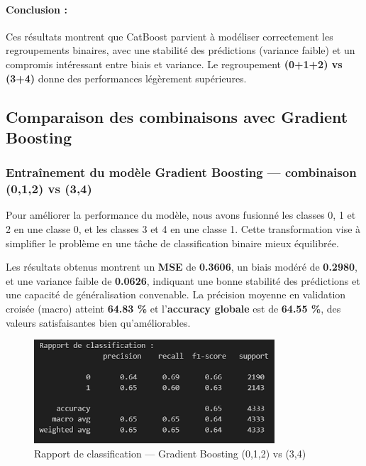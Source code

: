 \documentclass[a4paper,12pt]{article}
\begin{document}
\paragraph{Conclusion :} Ces résultats montrent que CatBoost parvient à modéliser correctement les regroupements binaires, avec une stabilité des prédictions (variance faible) et un compromis intéressant entre biais et variance. Le regroupement \textbf{(0+1+2) vs (3+4)} donne des performances légèrement supérieures.

\subsection{Comparaison des combinaisons avec Gradient Boosting}

\subsubsection{Entraînement du modèle Gradient Boosting — combinaison (0,1,2) vs (3,4)}

Pour améliorer la performance du modèle, nous avons fusionné les classes 0, 1 et 2 en une classe 0, et les classes 3 et 4 en une classe 1. Cette transformation vise à simplifier le problème en une tâche de classification binaire mieux équilibrée.

Les résultats obtenus montrent un \textbf{MSE} de \textbf{0.3606}, un biais modéré de \textbf{0.2980}, et une variance faible de \textbf{0.0626}, indiquant une bonne stabilité des prédictions et une capacité de généralisation convenable. La précision moyenne en validation croisée (macro) atteint \textbf{64.83 \%} et l'\textbf{accuracy globale} est de \textbf{64.55 \%}, des valeurs satisfaisantes bien qu'améliorables.

\begin{figure}[H]
    \centering
    \includegraphics[width=0.8\textwidth]{classification_report_gb_012_vs_34.png}
    \caption{Rapport de classification — Gradient Boosting (0,1,2) vs (3,4)}
    \label{fig:gb_report_012_34}
\end{figure}
\end{document}
